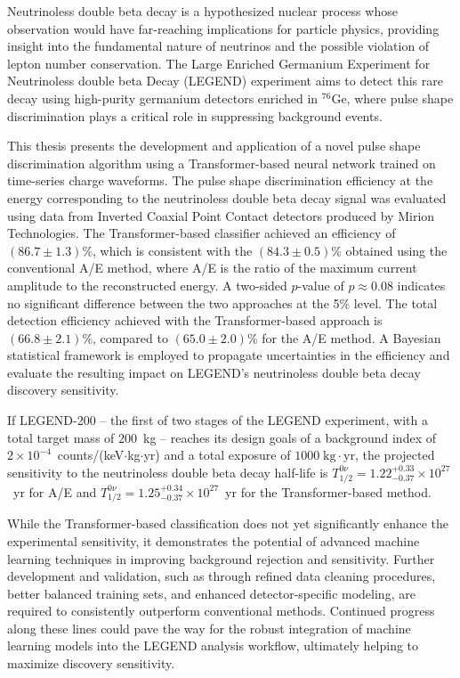 Neutrinoless double beta decay is a hypothesized nuclear process whose observation would have far-reaching implications for particle physics, providing insight into the fundamental nature of neutrinos and the possible violation of lepton number conservation. 
The Large Enriched Germanium Experiment for Neutrinoless double beta Decay (LEGEND) experiment aims to detect this rare decay using high-purity germanium detectors enriched in $^{76}$Ge, where pulse shape discrimination plays a critical role in suppressing background events. 

This thesis presents the development and application of a novel pulse shape discrimination algorithm using a Transformer-based neural network trained on time-series charge waveforms. 
The pulse shape discrimination efficiency at the energy corresponding to the neutrinoless double beta decay signal was evaluated using data from Inverted Coaxial Point Contact detectors produced by Mirion Technologies. The Transformer-based classifier achieved an efficiency of $(86.7 \pm 1.3)$\%, which is consistent with the $(84.3 \pm 0.5)$\% obtained using the conventional A/E method, where A/E is the ratio of the maximum current amplitude to the reconstructed energy. A two-sided $p$-value of $p \approx 0.08$ indicates no significant difference between the two approaches at the 5\% level. The total detection efficiency achieved with the Transformer-based approach is $(66.8 \pm 2.1)$\%, compared to $(65.0 \pm 2.0)$\% for the A/E method. 
A Bayesian statistical framework is employed to propagate uncertainties in the efficiency and evaluate the resulting impact on LEGEND's neutrinoless double beta decay discovery sensitivity. 

If LEGEND-200 -- the first of two stages of the LEGEND experiment, with a total target mass of 200~kg -- reaches its design goals of a background index of $2 \times 10^{-4}$~counts/(keV$\cdot$kg$\cdot$yr) and a total exposure of $1000 \; \mathrm{kg} \cdot \mathrm{yr}$, the projected sensitivity to the neutrinoless double beta decay half-life is $T^{0 \nu}_{1/2} = 1.22^{+0.33}_{-0.37} \times 10^{27}$~yr for A/E and $T^{0 \nu}_{1/2} = 1.25^{+0.34}_{-0.37} \times 10^{27}$~yr for the Transformer-based method. 

While the Transformer-based classification does not yet significantly enhance the experimental sensitivity, it demonstrates the potential of advanced machine learning techniques in improving background rejection and sensitivity. Further development and validation, such as through refined data cleaning procedures, better balanced training sets, and enhanced detector-specific modeling, are required to consistently outperform conventional methods. 
Continued progress along these lines could pave the way for the robust integration of machine learning models into the LEGEND analysis workflow, ultimately helping to maximize discovery sensitivity.